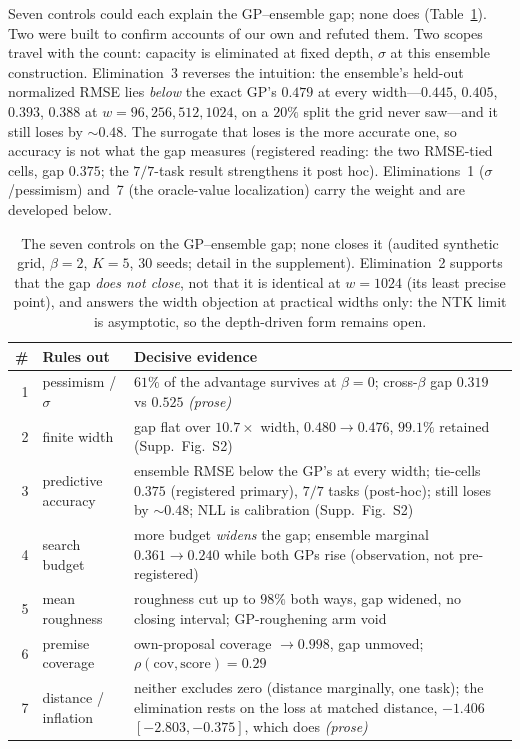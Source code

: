 \documentclass[letterpaper]{article} %
\theoremstyle{plain}
\newcommand{\mdemph}[1]{\emph{#1}}
\begin{document}
Seven controls could each explain the GP--ensemble gap; none does (Table~\ref{tab:elim}). Two were built to confirm accounts of our own and refuted them. Two scopes travel with the count: capacity is eliminated at fixed depth, $\sigma$ at this ensemble construction. Elimination~3 reverses the intuition: the ensemble's held-out normalized RMSE lies \mdemph{below} the exact GP's $0.479$ at every width---$0.445$, $0.405$, $0.393$, $0.388$ at $w{=}96,256,512,1024$, on a $20\%$ split the grid never saw---and it still loses by ${\sim}0.48$. The surrogate that loses is the more accurate one, so accuracy is not what the gap measures (registered reading: the two RMSE-tied cells, gap $0.375$; the $7/7$-task result strengthens it post hoc). Eliminations~1 ($\sigma$/pessimism) and~7 (the oracle-value localization) carry the weight and are developed below.

\begin{table}[t]
\centering
\caption{The seven controls on the GP--ensemble gap; none closes it (audited synthetic grid, $\beta{=}2$, $K{=}5$, 30 seeds; detail in the supplement). Elimination~2 supports that the gap \emph{does not close}, not that it is identical at $w{=}1024$ (its least precise point), and answers the width objection at practical widths only: the NTK limit is asymptotic, so the depth-driven form remains open.}
\label{tab:elim}
\footnotesize
\setlength{\tabcolsep}{3pt}
\begin{tabular}{@{}rl p{4.85cm}@{}}
\toprule
\# & Rules out & Decisive evidence \\
\midrule
1 & pessimism / $\sigma$ & $61\%$ of the advantage survives at $\beta{=}0$; cross-$\beta$ gap $0.319$ vs $0.525$ \emph{(prose)} \\
2 & finite width & gap flat over $10.7\times$ width, $0.480\!\to\!0.476$, $99.1\%$ retained (Supp.\ Fig.\ S2) \\
3 & predictive accuracy & ensemble RMSE below the GP's at every width; tie-cells $0.375$ (registered primary), $7/7$ tasks (post-hoc); still loses by ${\sim}0.48$; NLL is calibration (Supp.\ Fig.\ S2) \\
4 & search budget & more budget \emph{widens} the gap; ensemble marginal $0.361\!\to\!0.240$ while both GPs rise (observation, not pre-registered) \\
5 & mean roughness & roughness cut up to $98\%$ both ways, gap widened, no closing interval; GP-roughening arm void \\
6 & premise coverage & own-proposal coverage ${\to}0.998$, gap unmoved; $\rho(\text{cov},\text{score}){=}0.29$ \\
7 & distance / inflation & neither excludes zero (distance marginally, one task); the elimination rests on the loss at matched distance, $-1.406$ $[-2.803,-0.375]$, which does \emph{(prose)} \\
\bottomrule
\end{tabular}
\end{table}
\end{document}
